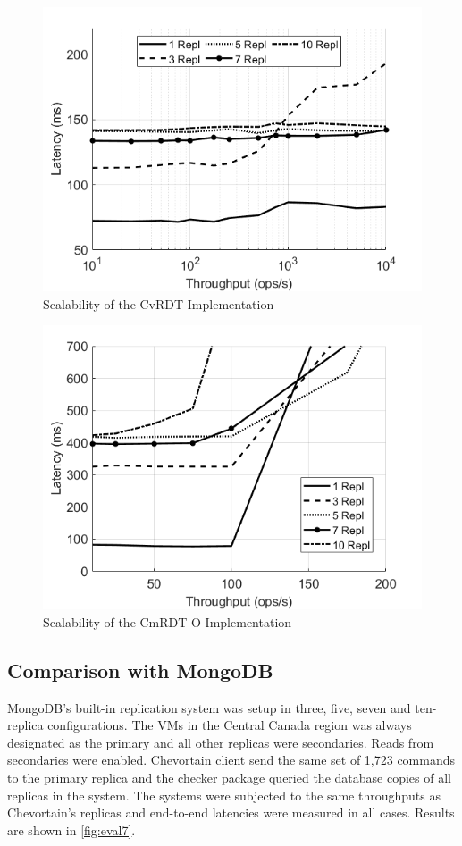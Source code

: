 \documentclass[sigconf,nonacm,10pt]{acmart}
\begin{document}
\begin{figure}[h]
  \centering
  \includegraphics[width=\linewidth]{Fig11SCvRDT}
  \caption{Scalability of the CvRDT Implementation}
  \label{fig:eval5}
\end{figure}

\begin{figure}[h]
  \centering
  \includegraphics[width=\linewidth]{Fig12SCmRDTO}
  \caption{Scalability of the CmRDT-O Implementation}
  \label{fig:eval6}
\end{figure}

\subsection{Comparison with MongoDB}
MongoDB's built-in replication system was setup in three, five, seven and ten-replica configurations. The VMs in the Central Canada region was always designated as the primary and all other replicas were secondaries. Reads from secondaries were enabled. Chevortain client send the same set of 1,723 commands to the primary replica and the checker package queried the database copies of all replicas in the system. The systems were subjected to the same throughputs as Chevortain's replicas and end-to-end latencies were measured in all cases. Results are shown in \ref{fig:eval7}. 
\end{document}
